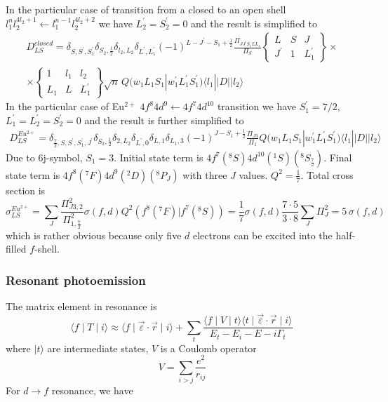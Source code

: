 \documentclass[a4paper,oneside,12pt]{extarticle}
\begin{document}
In the particular case of transition from a closed to an open shell $l_1^{n} l_2^{4l_2+1} \leftarrow l_1^{n-1} l_2^{4l_2+2}$ we have $L_2^{\prime}=S_2^{\prime}=0$ and the result is simplified to
\begin{multline}
D_{LS}^{closed} = \delta_{S,S^{\prime},S_1^{\prime}} \delta_{S_2,\frac{1}{2}} \delta_{l_2,L_2} \delta_{L^{\prime}, L_1^{\prime}}
%
(-1)^{L-J^{\prime} -S_1+\frac{1}{2}} \frac{\Pi_{JJ^{\prime} S_1 L L_1}}{\Pi_S}
\left \{
\begin{array}{ccc}
L & S & J \\
J^{\prime} & 1 & L_1^{\prime}
\end{array}
\right \}
\times \\ \times
%
\left \{
\begin{array}{ccc}
1 &l_1 & l_2 \\
L_1 & L & L_1^{\prime}
\end{array}
\right \}
%
\sqrt{n}\, Q(w_1 L_1 S_1 | w_1^{\prime} L_1^{\prime} S_1^{\prime})
\langle l_1 || D || l_2 \rangle
\end{multline}
%
In the particular case of Eu$^{2+}$ $4f^8 4d^{9} \leftarrow 4f^7 4d^{10}$ transition we have $S_1^{\prime}=7/2$, $L_1^{\prime}=L_2^{\prime}=S_2^{\prime}=0$ and the result is further simplified to
%
\begin{multline}
D_{LS}^{Eu^{2+}} = \delta_{\frac{7}{2},S,S^{\prime},S_1^{\prime},J^{\prime}} \delta_{S_2,\frac{1}{2}} \delta_{2,L_2} \delta_{L^{\prime}, 0} \delta_{L, 1} \delta_{L_1, 3}
(-1)^{J -S_1+\frac{1}{2}} \frac{\Pi_{J 3}}{\Pi_{1}}
Q(w_1 L_1 S_1 | w_1^{\prime} L_1^{\prime} S_1^{\prime})
\langle l_1 || D || l_2 \rangle
\end{multline}
%
Due to 6j-symbol, $S_1=3$. Initial state term is $4f^7 (^8S) 4d^{10} (^1S) (^8S_{\frac{7}{2}})$. Final state term is $4f^8 (^7F) 4d^{9} (^2D) (^8P_J)$ with three $J$ values. $Q^2=\frac{1}{7}$. Total cross section is
$$
\sigma_{LS}^{Eu^{2+}} = \sum_J \frac{\Pi^2_{J 3,2}}{\Pi^2_{1,\frac{7}{2}}}  \sigma(f,d)
Q^2(f^8(^7F) | f^7(^8S)) = \frac{1}{7} \sigma(f,d)  \frac{7\cdot 5}{3\cdot 8} \sum_J \Pi^2_{J} = 5\, \sigma(f,d) 
$$
which is rather obvious because only five $d$ electrons can be excited into the half-filled $f$-shell.
%



\subsubsection {Resonant photoemission}
%
The matrix element in resonance is
%
$$
\langle f \mid T \mid i \rangle \approx
\langle f \mid \vec{\varepsilon} \cdot \vec{r} \mid i \rangle +
\sum_t \frac{\langle f \mid V \mid t \rangle \langle t \mid \vec{\varepsilon} \cdot \vec{r} \mid i \rangle}{E_t-E_i-E-i\Gamma_t} \,
$$
%
where $|t\rangle$ are intermediate states, $V$ is a Coulomb operator
$$
V = \sum_{i>j} \frac{e^2}{r_{ij}}
$$
For $d\rightarrow f$ resonance, we have
\end{document}
